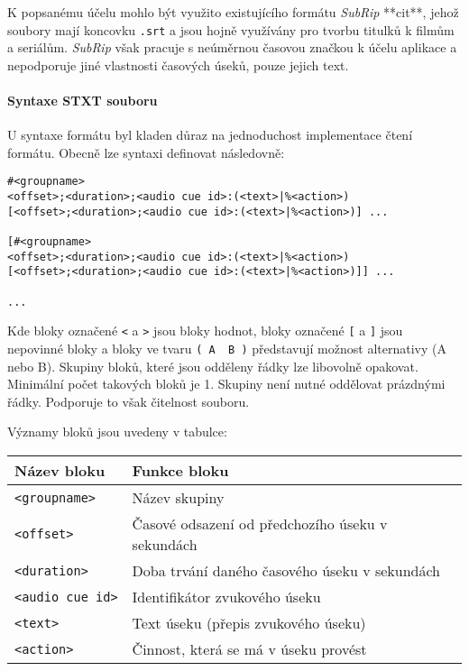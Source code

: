 K popsanému účelu mohlo být využito existujícího formátu \emph{SubRip} **cit**,
jehož soubory mají koncovku \texttt{.srt} a jsou hojně využívány pro
tvorbu titulků k filmům a seriálům. \emph{SubRip} však pracuje s
neúměrnou časovou značkou k účelu aplikace a nepodporuje jiné vlastnosti
časových úseků, pouze jejich text.

\paragraph{Syntaxe STXT souboru}\label{syntaxe-stxt-souboru}

U syntaxe formátu byl kladen důraz na jednoduchost implementace čtení
formátu. Obecně lze syntaxi definovat následovně:

\begin{verbatim}
#<groupname>
<offset>;<duration>;<audio cue id>:(<text>|%<action>)
[<offset>;<duration>;<audio cue id>:(<text>|%<action>)] ...

[#<groupname>
<offset>;<duration>;<audio cue id>:(<text>|%<action>)
[<offset>;<duration>;<audio cue id>:(<text>|%<action>)]] ...

...
\end{verbatim}

Kde bloky označené \texttt{\textless{}} a \texttt{\textgreater{}} jsou
bloky hodnot, bloky označené \texttt{{[}} a \texttt{{]}} jsou nepovinné
bloky a bloky ve tvaru \texttt{(\ A\ \textbar{}\ B\ )} představují
možnost alternativy (A nebo B). Skupiny bloků, které jsou odděleny řádky
lze libovolně opakovat. Minimální počet takových bloků je 1. Skupiny
není nutné oddělovat prázdnými řádky. Podporuje to však čitelnost souboru.

Významy bloků jsou uvedeny v tabulce:

\begin{longtable}[]{@{}ll@{}}
\toprule
Název bloku & Funkce bloku\tabularnewline
\midrule
\endhead
\texttt{\textless{}groupname\textgreater{}} & Název
skupiny\tabularnewline
\texttt{\textless{}offset\textgreater{}} & Časové odsazení od
předchozího úseku v sekundách\tabularnewline
\texttt{\textless{}duration\textgreater{}} & Doba trvání daného časového
úseku v sekundách\tabularnewline
\texttt{\textless{}audio\ cue\ id\textgreater{}} & Identifikátor
zvukového úseku\tabularnewline
\texttt{\textless{}text\textgreater{}} & Text úseku (přepis zvukového
úseku)\tabularnewline
\texttt{\textless{}action\textgreater{}} & Činnost, která se má v úseku
provést\tabularnewline
\bottomrule
\end{longtable}

